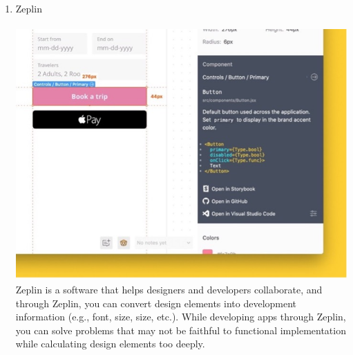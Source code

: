 \documentclass[conference]{IEEEtran}
\begin{document}
\begin{enumerate}
 \break
   
    \item Zeplin\\ \\
    \includegraphics[scale=0.32]{assets/Zp.jpg}
    Zeplin is a software that helps designers and developers collaborate, and through Zeplin, you can convert design elements into development information (e.g., font, size, size, etc.). While developing apps through Zeplin, you can solve problems that may not be faithful to functional implementation while calculating design elements too deeply.\\\\\\
 
\end{enumerate}{}

\break
\end{document}
